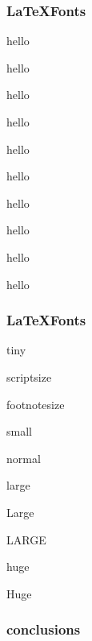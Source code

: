 \begin{frame}\frametitle{\LaTeX Fonts}
\centering
\tiny hello

\scriptsize hello

\footnotesize hello

\small hello

\normalsize hello

\large hello

\Large hello

\LARGE hello

\huge hello

\centering
\Huge hello

\end{frame}

\begin{frame}\frametitle{\LaTeX Fonts}
\centering
\tiny tiny

\scriptsize scriptsize

\footnotesize footnotesize

\small small

\normalsize normal

\large large

\Large Large

\LARGE LARGE 

\huge huge

\Huge Huge

\end{frame}


\usebackgroundtemplate{}

\begin{frame}\frametitle{conclusions}

\vfill
{}
\vfill
{}
\vfill
{}
\end{frame}
